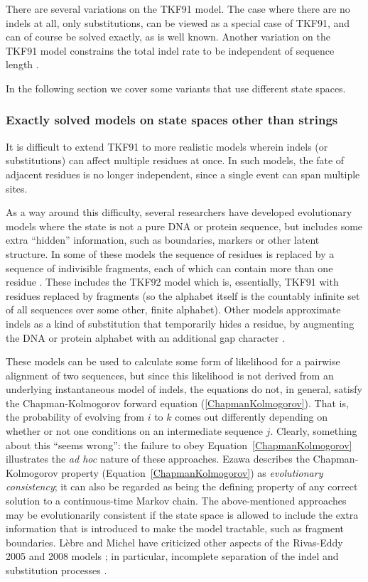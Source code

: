 \documentclass{bmcart}
\newcommand{\eqref}[1]{Equation~\ref{#1}}
\begin{document}
There are several variations on the TKF91 model.
The case where there are no indels at all, only substitutions, can be viewed as a special case of TKF91,
and can of course be solved exactly, as is well known.
Another variation on the TKF91 model constrains the total indel rate to be independent of sequence
length \cite{BouchardCoteJordan2013}.

In the following section we cover some variants that use different state spaces.

\subsubsection*{Exactly solved models on state spaces other than strings}

It is difficult to extend TKF91 to more realistic models wherein indels (or substitutions)
can affect multiple residues at once.
In such models, the fate of adjacent residues is no longer independent, since a single event can span multiple sites.

As a way around this difficulty, several researchers have developed
evolutionary models where the state is not a pure DNA or protein sequence,
but includes some extra ``hidden'' information,
such as boundaries, markers or other latent structure.
In some of these models the sequence of residues is replaced by a sequence of indivisible fragments,
each of which can contain more than one residue \cite{ThorneEtal92,Metzler2003,RivasEddy2015}.
These includes the TKF92 model \cite{ThorneEtal92} which is, essentially, TKF91 with residues replaced by
fragments (so the alphabet itself is the countably infinite set of all sequences over some other, finite alphabet).
Other models approximate indels as a kind of substitution that temporarily hides a residue,
by augmenting the DNA or protein alphabet with an additional gap character \cite{McGuireEtAl2001,Rivas05,RivasEddy2008}.

These models can be used to calculate some form of likelihood for a pairwise alignment of two sequences,
but since this likelihood is not derived from an underlying instantaneous model of indels,
the equations do not, in general, satisfy the Chapman-Kolmogorov forward equation
(\ref{ChapmanKolmogorov}).
That is, the probability of evolving from $i$ to $k$ comes out differently
depending on whether or not one conditions on an intermediate sequence $j$.
Clearly, something about this ``seems wrong'':
the failure to obey \eqref{ChapmanKolmogorov} illustrates the {\em ad hoc}
nature of these approaches.
Ezawa \cite{Ezawa2016b} describes the Chapman-Kolmogorov property
(\eqref{ChapmanKolmogorov}) as {\em evolutionary consistency};
it can also be regarded as being the defining property
of any correct solution to a continuous-time Markov chain.
The above-mentioned approaches may be evolutionarily consistent if the state space
is allowed to include the extra information that is introduced to make the model tractable,
such as fragment boundaries.
\color{red}
Lèbre and Michel have criticized other aspects of the Rivas-Eddy 2005 and 2008 models \cite{Rivas05,RivasEddy2008};
in particular, incomplete separation of the indel and substitution processes \cite{pmid22644340}.
\color{black}
\end{document}
